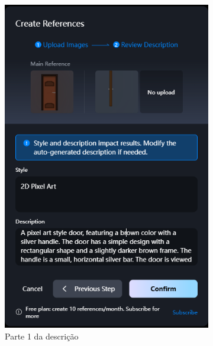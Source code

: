 \begin{figure}[htbp]
    \centering
    \caption{\small Tela da criação da referência da porta marrom no Vidu}
    \label{fig:viduReferenciaPortaA}
    \begin{subfigure}{0.4\linewidth}
        \includegraphics[width=1\linewidth]{figs/vidu/tela_referencia_porta.PNG}
        \caption{\small Parte 1 da descrição}
        \label{fig:viduReferenciaPortaA1}
    \end{subfigure}
    \begin{subfigure}{0.4\linewidth}

\end{subfigure}
\end{figure}
